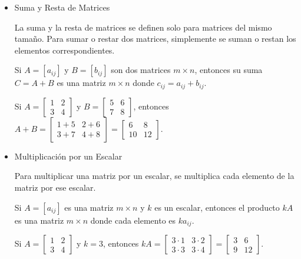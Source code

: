\begin{itemize}
	\item Suma y Resta de Matrices
	
	La suma y la resta de matrices se definen solo para matrices del mismo tamaño.  Para sumar o restar dos matrices, simplemente se suman o restan los elementos correspondientes.
	
	Si $A = [a_{ij}]$ y $B = [b_{ij}]$ son dos matrices $m \times n$, entonces su suma $C = A + B$ es una matriz $m \times n$ donde $c_{ij} = a_{ij} + b_{ij}$.
	
	\begin{example}
		Si $A = \begin{bmatrix} 1 & 2 \\ 3 & 4 \end{bmatrix}$ y $B = \begin{bmatrix} 5 & 6 \\ 7 & 8 \end{bmatrix}$, entonces 
		$A + B = \begin{bmatrix} 1+5 & 2+6 \\ 3+7 & 4+8 \end{bmatrix} = \begin{bmatrix} 6 & 8 \\ 10 & 12 \end{bmatrix}$.
	\end{example}
	
	\item Multiplicación por un Escalar
	
	Para multiplicar una matriz por un escalar, se multiplica cada elemento de la matriz por ese escalar.
	
	Si $A = [a_{ij}]$ es una matriz $m \times n$ y $k$ es un escalar, entonces el producto $kA$ es una matriz $m \times n$ donde cada elemento es $ka_{ij}$.
	
	\begin{example}
		Si $A = \begin{bmatrix} 1 & 2 \\ 3 & 4 \end{bmatrix}$ y $k = 3$, entonces 
		$kA = \begin{bmatrix} 3 \cdot 1 & 3 \cdot 2 \\ 3 \cdot 3 & 3 \cdot 4 \end{bmatrix} = \begin{bmatrix} 3 & 6 \\ 9 & 12 \end{bmatrix}$.
	\end{example}
	

\end{itemize}

